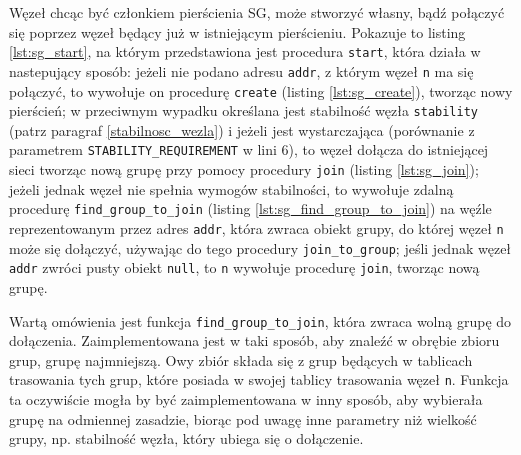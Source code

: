 \documentclass[12pt, twoside, openany]{report}
\begin{document}
Węzeł chcąc być członkiem pierścienia SG, może stworzyć własny, bądź połączyć się poprzez węzeł będący już w istniejącym pierścieniu. Pokazuje to listing \ref{lst:sg_start}, na którym przedstawiona jest procedura \texttt{start}, która działa w nastepujący sposób: jeżeli nie podano adresu \texttt{addr}, z którym węzeł \texttt{n} ma się połączyć, to wywołuje on procedurę \texttt{create} (listing \ref{lst:sg_create}), tworząc nowy pierścień; w przeciwnym wypadku określana jest stabilność węzła \texttt{stability} (patrz paragraf \ref{stabilnosc_wezla}) i jeżeli jest wystarczająca (porównanie z parametrem \texttt{STABILITY\_REQUIREMENT} w lini 6), to węzeł dołącza do istniejącej sieci tworząc nową grupę przy pomocy procedury \texttt{join} (listing \ref{lst:sg_join}); jeżeli jednak węzeł nie spełnia wymogów stabilności, to wywołuje zdalną procedurę \texttt{find\_group\_to\_join} (listing \ref{lst:sg_find_group_to_join}) na węźle reprezentowanym przez adres \texttt{addr}, która zwraca obiekt grupy, do której węzeł \texttt{n} może się dołączyć, używając do tego procedury \texttt{join\_to\_group}; jeśli jednak węzeł \texttt{addr} zwróci pusty obiekt \texttt{null}, to \texttt{n} wywołuje procedurę \texttt{join}, tworząc nową grupę. 











Wartą omówienia jest funkcja \texttt{find\_group\_to\_join}, która zwraca wolną grupę do dołączenia. Zaimplementowana jest w taki sposób, aby znaleźć w obrębie zbioru grup, grupę najmniejszą. Owy zbiór składa się z grup będących w tablicach trasowania tych grup, które posiada w swojej tablicy trasowania węzeł \texttt{n}. Funkcja ta oczywiście mogła by być zaimplementowana w inny sposób, aby wybierała grupę na odmiennej zasadzie, biorąc pod uwagę inne parametry niż wielkość grupy, np. stabilność węzła, który ubiega się o dołączenie.
\end{document}
